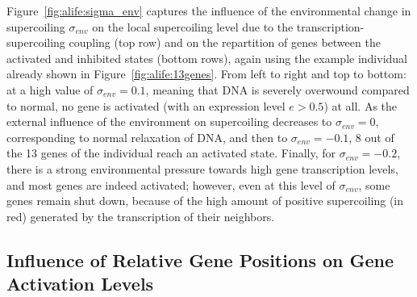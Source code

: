 Figure~\ref{fig:alife:sigma_env} captures the influence of the environmental change in supercoiling $\sigma_{env}$ on the local supercoiling level due to the transcription-supercoiling coupling (top row) and on the repartition of genes between the activated and inhibited states (bottom rows), again using the example individual already shown in Figure~\ref{fig:alife:13genes}.
From left to right and top to bottom: at a high value of $\sigma_{env} = 0.1$, meaning that DNA is severely overwound compared to normal, no gene is activated (with an expression level $e > 0.5$) at all.
As the external influence of the environment on supercoiling decreases to $\sigma_{env} = 0$, corresponding to normal relaxation of DNA, and then to $\sigma_{env} = -0.1$, 8 out of the 13 genes of the individual reach an activated state.
Finally, for $\sigma_{env} = -0.2$, there is a strong environmental pressure towards high gene transcription levels, and most genes are indeed activated; however, even at this level of $\sigma_{env}$, some genes remain shut down, because of the high amount of positive supercoiling (in red) generated by the transcription of their neighbors.


\subsection{Influence of Relative Gene Positions on Gene Activation Levels}
\label{sec:alife:gene_pos}

